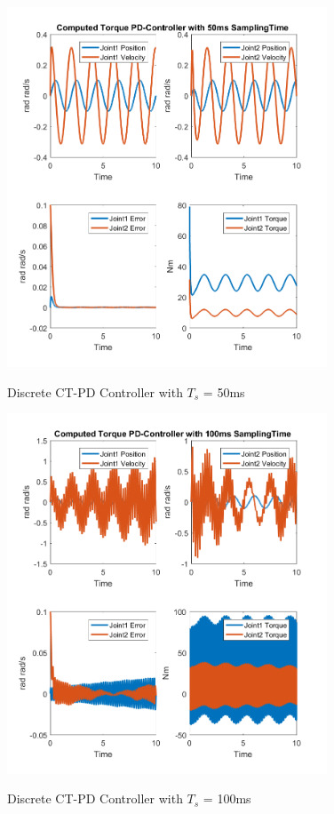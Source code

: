 \begin{figure}[h]
	\centering
	\includegraphics[width=0.85\textwidth]{pics/ComputedTorquePD-Controllerwith50msSamplingTime.png}\\
	\caption{Discrete CT-PD Controller with $T_s$ = 50ms}
	\label{fig:ch3_digi2}
\end{figure}

\begin{figure}[h]
	\centering
	\includegraphics[width=0.85\textwidth]{pics/ComputedTorquePD-Controllerwith100msSamplingTime.png}\\
	\caption{Discrete CT-PD Controller with $T_s$ = 100ms}
	\label{fig:ch3_digi3}
\end{figure}
 